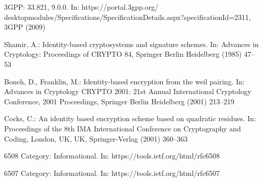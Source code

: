 \documentclass{llncs} %
\begin{document}
\begin{thebibliography}{5}
3GPP:
 33.821, 9.0.0.
\newblock In:
  https://portal.3gpp.org/\\desktopmodules/Specifications/SpecificationDetails.aspx?specificationId=2311,
  3GPP (2009)

Shamir, A.:
\newblock Identity-based cryptosystems and signature schemes.
\newblock In: Advances in Cryptology: Proceedings of CRYPTO 84, Springer Berlin
  Heidelberg (1985)  47--53

Boneh, D., Franklin, M.:
\newblock Identity-based encryption from the weil pairing.
\newblock In: Advances in Cryptology CRYPTO 2001: 21st Annual International
  Cryptology Conference, 2001 Proceedings, Springer Berlin Heidelberg (2001)
  213--219

Cocks, C.:
\newblock An identity based encryption scheme based on quadratic residues.
\newblock In: Proceedings of the 8th IMA International Conference on
  Cryptography and Coding, London, UK, UK, Springer-Verlag (2001)  360--363

 6508 {C}ategory: {I}nformational.
\newblock In: https://tools.ietf.org/html/rfc6508

 6507 {C}ategory: {I}nformational.
\newblock In: https://tools.ietf.org/html/rfc6507

\end{thebibliography}
\end{document}

